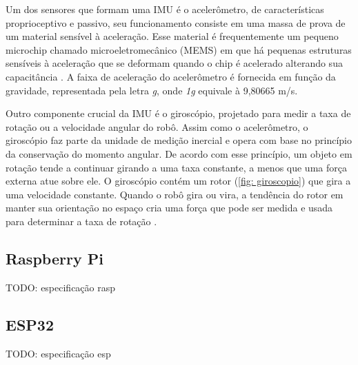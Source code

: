 Um dos sensores que formam uma IMU é o acelerômetro, de características proprioceptivo e passivo, seu funcionamento consiste em uma massa de prova de um material sensível à aceleração. Esse material é frequentemente um pequeno microchip chamado microeletromecânico (MEMS) em que há pequenas estruturas sensíveis à aceleração que se deformam quando o chip é acelerado alterando sua capacitância \cite{Lawrence1998}. A faixa de aceleração do acelerômetro é fornecida em função da gravidade, representada pela letra \textit{g}, onde \textit{1g} equivale à 9,80665 m/s. 

Outro componente crucial da IMU é o giroscópio, projetado para medir a taxa de rotação ou a velocidade angular do robô. Assim como o acelerômetro, o giroscópio faz parte da unidade de medição inercial e opera com base no princípio da conservação do momento angular. De acordo com esse princípio, um objeto em rotação tende a continuar girando a uma taxa constante, a menos que uma força externa atue sobre ele. O giroscópio contém um rotor (\ref{fig: giroscopio}) que gira a uma velocidade constante. Quando o robô gira ou vira, a tendência do rotor em manter sua orientação no espaço cria uma força que pode ser medida e usada para determinar a taxa de rotação \cite{Groves2013}.

\subsection{Raspberry Pi}

TODO: especificação rasp

\subsection{ESP32}

TODO: especificação esp